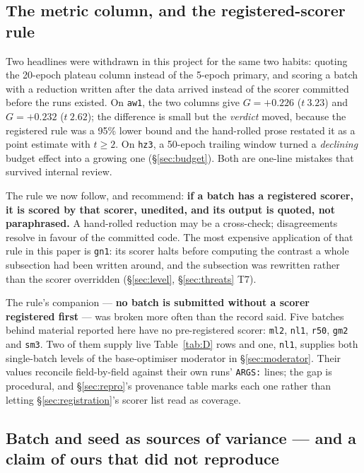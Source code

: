 \documentclass[10pt,letterpaper]{article}
\newcommand{\Gstat}{G}                         %
\newcommand{\arm}[1]{\texttt{#1}}
\begin{document}
\subsection{The metric column, and the registered-scorer rule}
\label{sec:metric-column}

Two headlines were withdrawn in this project for the same two habits: quoting the 20-epoch plateau
column instead of the 5-epoch primary, and scoring a batch with a reduction written after the data
arrived instead of the scorer committed before the runs existed. On \arm{aw1}, the two columns give
$\Gstat = +0.226$ ($t\ 3.23$) and $\Gstat = +0.232$ ($t\ 2.62$); the difference is small but the
\emph{verdict} moved, because the registered rule was a 95\% lower bound and the hand-rolled prose
restated it as a point estimate with $t \ge 2$. On \arm{hz3}, a 50-epoch trailing window turned a
\emph{declining} budget effect into a growing one (\S\ref{sec:budget}). Both are one-line mistakes that
survived internal review.

The rule we now follow, and recommend: \textbf{if a batch has a registered scorer, it is scored by
that scorer, unedited, and its output is quoted, not paraphrased.} A hand-rolled reduction may be a
cross-check; disagreements resolve in favour of the committed code. The most expensive application
of that rule in this paper is \arm{gn1}: its scorer halts before computing the contrast a whole
subsection had been written around, and the subsection was rewritten rather than the scorer
overridden (\S\ref{sec:level}, \S\ref{sec:threats} T7).

The rule's companion --- \textbf{no batch is submitted without a scorer registered first} --- was
broken more often than the record said. Five batches behind material reported here have no
pre-registered scorer: \arm{ml2}, \arm{nl1}, \arm{r50}, \arm{gm2} and \arm{sm3}. Two of them supply
live Table~\ref{tab:D} rows and one, \arm{nl1}, supplies both single-batch levels of the
base-optimiser moderator in \S\ref{sec:moderator}. Their values reconcile field-by-field against
their own runs' \texttt{ARGS:} lines; the gap is procedural, and \S\ref{sec:repro}'s provenance
table marks each one rather than letting \S\ref{sec:registration}'s scorer list read as coverage.

\subsection{Batch and seed as sources of variance --- and a claim of ours that did not reproduce}
\label{sec:variance}
\end{document}
